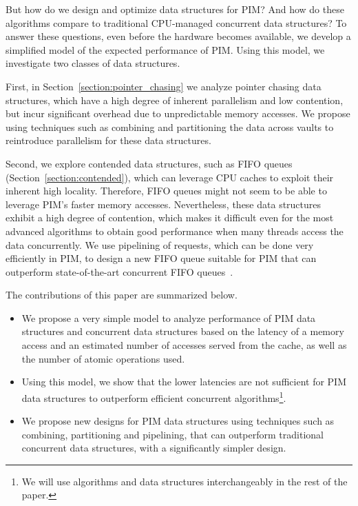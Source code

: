 But how do we design and optimize data structures for PIM? And how do these algorithms compare to traditional CPU-managed concurrent data structures? To answer these questions, even before the hardware becomes available, we develop a simplified model of the expected performance of PIM. Using this model, we 
investigate two classes of data structures. 

First, in Section~\ref{section:pointer_chasing} we analyze pointer chasing data 
structures, which have a high degree of inherent parallelism and low contention, but incur significant 
overhead due to unpredictable memory accesses. 
We propose using techniques such as combining and partitioning 
the data across vaults to reintroduce parallelism for these data structures.

Second, we explore contended data structures, such as FIFO queues (Section~\ref{section:contended}), 
which can leverage CPU caches to exploit their inherent high locality. 
Therefore, FIFO queues might not seem to be able to leverage PIM's faster memory accesses. 
Nevertheless, these data structures exhibit a high degree of contention, which makes it difficult even for 
the most advanced algorithms to obtain good performance when many threads access the data concurrently. 
We use pipelining of requests, which can be done very efficiently in PIM, to design a new FIFO queue 
suitable for PIM that can outperform state-of-the-art concurrent FIFO queues~\cite{Morrison13, Hendler10}.

The contributions of this paper are summarized below.
\begin{itemize}
\item We propose a very simple model to analyze performance of PIM data structures and
concurrent data structures based on the latency of a memory access and an estimated number of 
accesses served from the cache, as well as the number of atomic operations used. 
\item Using this model, we show that the lower latencies are not sufficient for PIM data structures
to outperform efficient concurrent algorithms\footnote{
We will use algorithms and data structures interchangeably in the rest of the paper.}. 
 \item We propose new designs for PIM 
data structures using 
techniques such as combining, partitioning and pipelining, that can outperform traditional 
concurrent data structures, with a significantly simpler design. 
\end{itemize}


